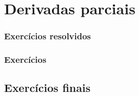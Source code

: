 
\chapter{Derivadas parciais}\label{chap:parciais}
\emconstrucao





\subsection*{Exercícios resolvidos}
\construirExeresol

\subsection*{Exercícios}
\construirExer

\section{Exercícios finais}
\construirExer


